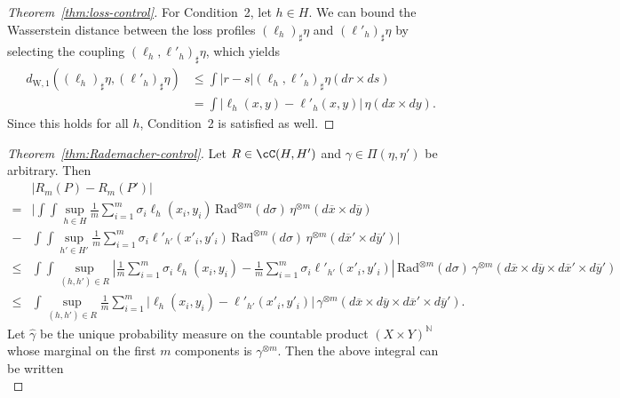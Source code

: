 \documentclass[twoside,11pt]{article}
\newcommand{\dWp}[1]{d_{\mathrm{W},#1}}
\newcommand{\dW}{\dWp 1}
\newcommand{\rad}{\mathrm{Rad}}%
\begin{document}
\begin{proof}[Theorem~\ref{thm:loss-control}]
    For Condition~2, let $h\in H$. We can bound the Wasserstein distance between the loss profiles $(\ell_h)_\sharp \eta$ and $(\ell'_h)_\sharp \eta$ by selecting the coupling $(\ell_h, \ell'_h)_\sharp \eta$, which yields
    \begin{align*}
        \dW((\ell_h)_\sharp \eta, (\ell'_h)_\sharp \eta)
        & \leq 
        \int \big| r - s \big| (\ell_h,\ell'_h)_\sharp \eta(dr{\times}ds)
        \\ & =
        \int\big|\ell_h(x,y) - \ell'_h(x,y)\big|\, \eta(dx\times dy).
    \end{align*}
    Since this holds for all $h$, Condition~2 is satisfied as well.
\end{proof}




\begin{proof}[Theorem~\ref{thm:Rademacher-control}]
    Let $R \in \cC(H,H')$ and $\gamma \in \Pi(\eta,\eta')$ be arbitrary. Then
    \begin{align*}
        & \big| R_m(P) - R_m(P') \big|
        \\ = &
        \bigg|
        \int\int \sup_{h\in H} \frac{1}{m} \sum_{i=1}^m \sigma_i \ell_h(x_i,y_i)
        \, \rad^{\otimes m}(d\sigma)
        \,\eta^{\otimes m}(d\overline x \times d\overline y)
        \\ - &
        \int\int \sup_{h'\in H'} \frac{1}{m} \sum_{i=1}^m \sigma_i \ell'_{h'}(x'_i,y'_i)
        \, \rad^{\otimes m}(d\sigma)
        \,\eta^{\otimes m}(d\overline x' \times d\overline y') 
        \bigg|
        \\ \leq &
        \int\int \sup_{(h,h')\in R} \left| \frac{1}{m} \sum_{i=1}^m \sigma_i \ell_h(x_i,y_i) - \frac{1}{m} \sum_{i=1}^m \sigma_i \ell'_{h'}(x'_i,y'_i)\right|
         \, \rad^{\otimes m}(d\sigma)
        \,\gamma^{\otimes m}(d\overline x {\times} d\overline y {\times} d\overline x' {\times} d\overline y')
        \\ \leq &
        \int \sup_{(h,h')\in R} \frac{1}{m} \sum_{i=1}^m \big|\ell_h(x_i,y_i) - \ell'_{h'}(x'_i,y'_i)\big|
        \,\gamma^{\otimes m}(d\overline x {\times} d\overline y {\times} d\overline x' {\times} d\overline y').
    \end{align*}
    Let $\widehat \gamma$ be the unique probability measure on the countable product $(X\times Y)^{\mathbb N}$ whose marginal on the first $m$ components is $\gamma^{\otimes m}$. Then the above integral can be written
    \begin{equation}
    \label{eq:rademacher-bound}

\end{equation}
\end{proof}
\end{document}
